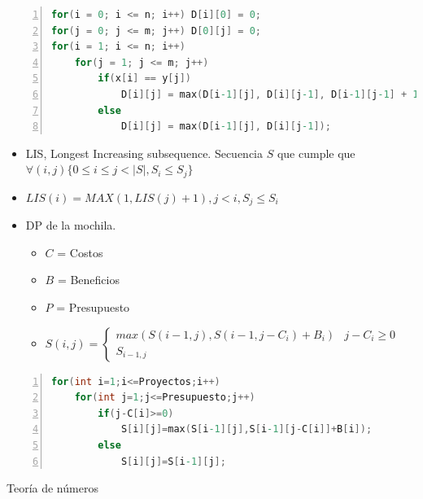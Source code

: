 \documentclass[a4paper,spanish,10pt]{article}
\begin{document}
					\begin{lstlisting}[language=C, numbers=left,tabsize=4]
for(i = 0; i <= n; i++) D[i][0] = 0;
for(j = 0; j <= m; j++) D[0][j] = 0;
for(i = 1; i <= n; i++) 
	for(j = 1; j <= m; j++)
		if(x[i] == y[j]) 
			D[i][j] = max(D[i-1][j], D[i][j-1], D[i-1][j-1] + 1);
		else 
			D[i][j] = max(D[i-1][j], D[i][j-1]);
	\end{lstlisting}
	\begin{itemize}
		\item LIS, Longest Increasing subsequence. Secuencia $S$ que cumple que $\forall(i,j)\{0 \le i \le j < |S| , S_i \le S_j\}$ 
		\item $LIS(i)=MAX(1,LIS(j)+1 ), j < i, S_j \le S_i$
		\item {
			DP de la mochila. 
			\begin{itemize}
				\item $C$ = Costos
				\item $B$ = Beneficios
				\item $P$ = Presupuesto
				\item $S(i,j)=  
				\begin{cases}
					max(S(i-1,j),S(i-1,j-C_i)+B_i) & j-C_i \ge 0\\
					S_{i-1,j}
				\end{cases}
				$
			\end{itemize}
		}
	\end{itemize}
	\begin{lstlisting}[language=C,numbers=left,tabsize=4]
for(int i=1;i<=Proyectos;i++)
	for(int j=1;j<=Presupuesto;j++)
		if(j-C[i]>=0)
			S[i][j]=max(S[i-1][j],S[i-1][j-C[i]]+B[i]);
		else
			S[i][j]=S[i-1][j];
	\end{lstlisting}
	\setcounter{page}{14}	
	\newpage
	Teor\'ia de n\'umeros\\
\end{document}

